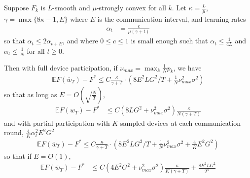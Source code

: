 \begin{theorem}
	Suppose $F_{k}$ is $L$-smooth and $\mu$-strongly convex for all
	$k$. Let $\kappa=\frac{L}{\mu}$, $\gamma=\max\{8\kappa-1,E\}$ where
	$E$ is the communication interval, and learning rates 
	\begin{align*}
	\alpha_{t} & =\frac{c}{\mu(\gamma+t)}
	\end{align*}
	so that $\alpha_{t}\leq2\alpha_{t+E}$, and where $0\leq c\leq1$
	is small enough such that
	$\alpha_{t} \leq\frac{1}{4L}$ and 
	$\alpha_{t} \leq\frac{1}{N}$ for all $t\geq0$. 
	
	Then with full device participation, if $\nu_{max}=\max_{k}\frac{1}{N}p_{k}$,
	we have 
	\begin{align*}
	\mathbb{E}F(\overline{w}_{T})-F^{\ast}\leq C\frac{\kappa}{\gamma+T}\cdot(8E^{2}LG^{2}/T+\frac{1}{N}\nu_{max}^{2}\sigma^{2})
	\end{align*}
	so that as long as $E=O(\sqrt{\frac{N}{T}})$, 
	\begin{align*}
	\mathbb{E}F(w_{T})-F^{\ast} & \leq C(8LG^{2}+\nu_{max}^{2}\sigma^{2})\frac{\kappa}{N(\gamma+T)}
	\end{align*}
	and with partial participation with $K$ sampled devices at each
	communication round, $\frac{4}{K}\alpha_{t}^{2}E^{2}G^{2}$
	\begin{align*}
	\mathbb{E}F(\overline{w}_{T})-F^{\ast}\leq C\frac{\kappa}{\gamma+T}\cdot(8E^{2}LG^{2}/T+\frac{1}{N}\nu_{max}^{2}\sigma^{2}+\frac{4}{K}E^{2}G^{2})
	\end{align*}
	so that if $E=O(1)$, 
	\begin{align*}
	\mathbb{E}F(\overline{w}_{T})-F^{\ast} & \leq C(4E^{2}G^{2}+\nu_{max}^{2}\sigma^{2})\frac{\kappa}{K(\gamma+T)}+\frac{8E^{2}LG^{2}}{T^{2}}
	\end{align*}
\end{theorem}

